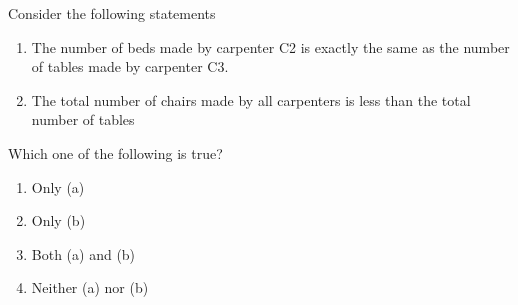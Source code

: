 \documentclass[journal]{IEEEtran}
\begin{document}
\begin{enumerate}[start=53]
    Consider the following statements
    \begin{enumerate}
        \item The number of beds made by carpenter C2 is exactly the same as the number of tables made by carpenter C3.
        \item The total number of chairs made by all carpenters is less than the total number of tables
    \end{enumerate}
    Which one of the following is true?
    \begin{multicols}{4}
        \begin{enumerate}
            \item Only (a)
            \item Only (b)
            \item Both (a) and (b)
            \item Neither (a) nor (b)
        \end{enumerate}
    \end{multicols}
    
\end{enumerate}
\end{document}
